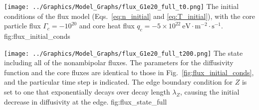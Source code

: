 	{\texttt{[image: ../Graphics/Model\_Graphs/flux\_G1e20\_full\_t0.png]}}
	{The initial conditions of the flux model (Eqs.~\ref{eq:n_initial} and \ref{eq:T_initial}), with the core particle flux $\Gamma_c = -10^{20}$ and core heat flux $q_c = -5\times 10^{22}~\text{eV}\cdot\text{m}^{-2}\cdot\text{s}^{-1}$.}
	{fig:flux_initial_conds}

	{\texttt{[image: ../Graphics/Model\_Graphs/flux\_G1e20\_full\_t200.png]}}
	{The state including all of the nonambipolar fluxes.
	The parameters for the diffusivity function and the core fluxes are identical to those in Fig.~\ref{fig:flux_initial_conds}, and the particular time step is indicated.
	The edge boundary condition for $Z$ is set to one that exponentially decays over decay length $\lambda_Z$, causing the initial decrease in diffusivity at the edge.}
	{fig:flux_state_full}


